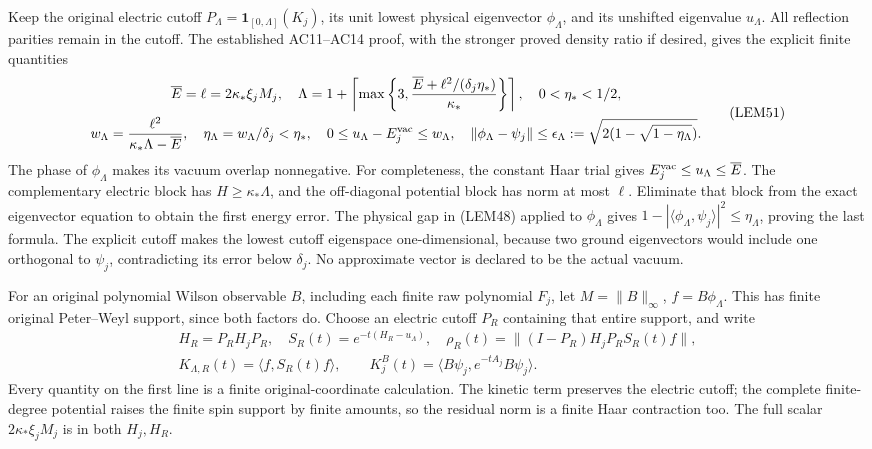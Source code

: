 \documentclass[11pt]{article}
\begin{document}
Keep the original electric cutoff \(P_\Lambda=\mathbf1_{[0,\Lambda]}(K_j)\), its unit lowest physical eigenvector \(\phi_\Lambda\), and its unshifted eigenvalue \(u_\Lambda\). All reflection parities remain in the cutoff. The established AC11–AC14 proof, with the stronger proved density ratio if desired, gives the explicit finite quantities
\[
\begin{gathered}
\overline E=\ell=2\kappa_*\xi_jM_j,\quad
\Lambda=1+\left\lceil\max\left\{3,
 {\overline E+\ell^2/(\delta_j\eta_*)\over\kappa_*}\right\}\right\rceil,
\quad 0<\eta_*<1/2,\\
w_\Lambda={\ell^2\over\kappa_*\Lambda-\overline E},\quad
\eta_\Lambda=w_\Lambda/\delta_j<\eta_*,\quad
0\le u_\Lambda-E_j^{\rm vac}\le w_\Lambda,\quad
\|\phi_\Lambda-\psi_j\|\le
\epsilon_\Lambda:=\sqrt{2(1-\sqrt{1-\eta_\Lambda})}.
\end{gathered}\tag{LEM51}
\]
The phase of \(\phi_\Lambda\) makes its vacuum overlap nonnegative. For completeness, the constant Haar trial gives \(E_j^{\rm vac}\le u_\Lambda\le\overline E\). The complementary electric block has \(H\ge\kappa_*\Lambda\), and the off-diagonal potential block has norm at most \(\ell\). Eliminate that block from the exact eigenvector equation to obtain the first energy error. The physical gap in (LEM48) applied to \(\phi_\Lambda\) gives \(1-|\langle\phi_\Lambda,\psi_j\rangle|^2\le\eta_\Lambda\), proving the last formula. The explicit cutoff makes the lowest cutoff eigenspace one-dimensional, because two ground eigenvectors would include one orthogonal to \(\psi_j\), contradicting its error below \(\delta_j\). No approximate vector is declared to be the actual vacuum.

For an original polynomial Wilson observable \(B\), including each finite raw polynomial \(F_j\), let \(M=\|B\|_\infty\), \(f=B\phi_\Lambda\). This has finite original Peter–Weyl support, since both factors do. Choose an electric cutoff \(P_R\) containing that entire support, and write
\[
\begin{gathered}
H_R=P_RH_jP_R,\quad S_R(t)=e^{-t(H_R-u_\Lambda)},\quad
\rho_R(t)=\|(I-P_R)H_jP_RS_R(t)f\|,\\
K_{\Lambda,R}(t)=\langle f,S_R(t)f\rangle,\qquad
K_j^B(t)=\langle B\psi_j,e^{-tA_j}B\psi_j\rangle .
\end{gathered}\tag{LEM52}
\]
Every quantity on the first line is a finite original-coordinate calculation. The kinetic term preserves the electric cutoff; the complete finite-degree potential raises the finite spin support by finite amounts, so the residual norm is a finite Haar contraction too. The full scalar \(2\kappa_*\xi_jM_j\) is in both \(H_j,H_R\).
\end{document}
